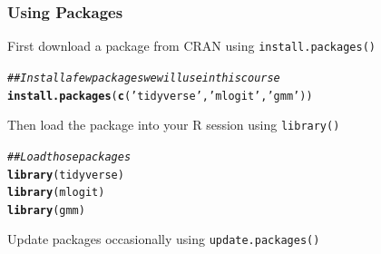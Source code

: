 \documentclass{beamer}\usepackage[]{graphicx}\usepackage[]{xcolor}
\makeatletter
\newcommand{\hlstr}[1]{\textcolor[rgb]{0.192,0.494,0.8}{#1}}%
\newcommand{\hlcom}[1]{\textcolor[rgb]{0.678,0.584,0.686}{\textit{#1}}}%
\newcommand{\hlstd}[1]{\textcolor[rgb]{0.345,0.345,0.345}{#1}}%
\newcommand{\hlkwd}[1]{\textcolor[rgb]{0.737,0.353,0.396}{\textbf{#1}}}%
\newenvironment{kframe}{%
 \def\at@end@of@kframe{}%
 \ifinner\ifhmode%
  \def\at@end@of@kframe{\end{minipage}}%
  \begin{minipage}{\columnwidth}%
 \fi\fi%
 \def\FrameCommand##1{\hskip\@totalleftmargin \hskip-\fboxsep
 \colorbox{shadecolor}{##1}\hskip-\fboxsep
     \hskip-\linewidth \hskip-\@totalleftmargin \hskip\columnwidth}%
 \MakeFramed {\advance\hsize-\width
   \@totalleftmargin\z@ \linewidth\hsize
   \@setminipage}}%
 {\par\unskip\endMakeFramed%
 \at@end@of@kframe}
\newenvironment{knitrout}{}{} %
\makeatother
\begin{document}
\begin{frame}[fragile]\frametitle{Using Packages}
    First download a package from CRAN using \texttt{install.packages()}
\begin{knitrout}\footnotesize
{}\color{fgcolor}\begin{kframe}
\begin{alltt}
\hlcom{## Install a few packages we will use in this course}
\hlkwd{install.packages}\hlstd{(}\hlkwd{c}\hlstd{(}\hlstr{'tidyverse'}\hlstd{,} \hlstr{'mlogit'}\hlstd{,} \hlstr{'gmm'}\hlstd{))}
\end{alltt}
\end{kframe}
\end{knitrout}
    \vspace{3ex}
    Then load the package into your R session using \texttt{library()}
\begin{knitrout}\footnotesize
{}\color{fgcolor}\begin{kframe}
\begin{alltt}
\hlcom{## Load those packages}
\hlkwd{library}\hlstd{(tidyverse)}
\hlkwd{library}\hlstd{(mlogit)}
\hlkwd{library}\hlstd{(gmm)}
\end{alltt}
\end{kframe}
\end{knitrout}
    \vspace{3ex}
    Update packages occasionally using \texttt{update.packages()}
\end{frame}
\end{document}
